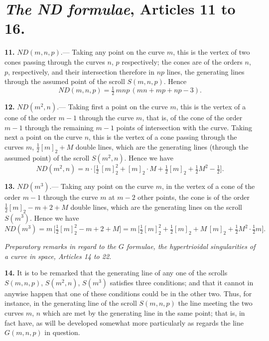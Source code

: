 \documentclass[11pt,a4paper]{article}
\begin{document}
\section*{\textit{The ND formulae}, Articles 11 to 16.}

\textbf{11.} $ND(m, n, p)$.--- Taking any point on the curve $m$, this is the vertex of two cones passing through the curves $n$, $p$ respectively; the cones are of the orders $n$, $p$, respectively, and their intersection therefore in $np$ lines, the generating lines through the assumed point of the scroll $S(m, n, p)$. Hence
\[
ND(m, n, p) = \tfrac{1}{2}\,mnp\,(mn + mp + np - 3).
\]

\medskip

\textbf{12.} $ND(m^2, n)$.--- Taking first a point on the curve $m$, this is the vertex of a cone of the order $m-1$ through the curve $m$, that is, of the cone of the order $m-1$ through the remaining $m-1$ points of intersection with the curve. Taking next a point on the curve $n$, this is the vertex of a cone passing through the curves $m$, $\frac{1}{2}[m]_2 + M$ double lines, which are the generating lines (through the assumed point) of the scroll $S(m^2, n)$. Hence we have
\[
ND(m^2, n) = n \cdot \bigl[\tfrac{1}{2}\,[m]_2^2 + [m]_2 \cdot M + \tfrac{1}{2}[m]_2 + \tfrac{1}{2}M^2 - \tfrac{1}{2}\bigr].
\]

\medskip

\textbf{13.} $ND(m^3)$.--- Taking any point on the curve $m$, in the vertex of a cone of the order $m-1$ through the curve $m$ at $m-2$ other points, the cone is of the order $\frac{1}{2}[m]_2 - m + 2 + M$ double lines, which are the generating lines on the scroll $S(m^3)$. Hence we have
\[
ND(m^3) = m\,\bigl[\tfrac{1}{2}[m]_2^2 - m + 2 + M\bigr] = m\,\bigl[\tfrac{1}{2}[m]_2^2 + \tfrac{1}{2}[m]_2 + M\,[m]_2 + \tfrac{1}{2}M^2 \cdot \tfrac{1}{2}m\bigr].
\]

\medskip

\noindent \textit{Preparatory remarks in regard to the $G$ formulae, the hypertrioidal singularities of a curve in space, Articles 14 to 22.}

\medskip

\textbf{14.} It is to be remarked that the generating line of any one of the scrolls $S(m, n, p)$, $S(m^2, n)$, $S(m^3)$ satisfies three conditions; and that it cannot in anywise happen that one of these conditions could be in the other two. Thus, for instance, in the generating line of the scroll $S(m, n, p)$ the line meeting the two curves $m$, $n$ which are met by the generating line in the same point; that is, in fact have, as will be developed somewhat more particularly as regards the line $G(m, n, p)$ in question.
\end{document}
